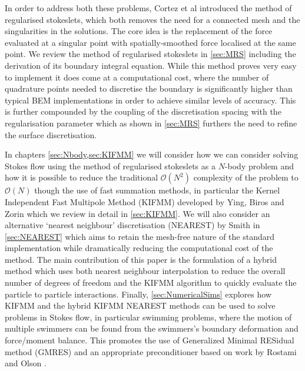 In order to address both these problems, Cortez et al \cite{Cortez2001,Cortez2005} introduced the method of regularised stokeslets, which both removes the need for a connected mesh and the singularities in the solutions. The core idea is the replacement of the force evaluated at a singular point with spatially-smoothed force localised at the same point. We review the method of regularised stokeslets in \cref{sec:MRS} including the derivation of its boundary integral equation. While this method proves very easy to implement it does come at a computational cost, where the number of quadrature points needed to discretise the boundary is significantly higher than typical BEM implementations in order to achieve similar levels of accuracy. This is further compounded by the coupling of the discretisation spacing with the regularisation parameter which as shown in \cref{sec:MRS} furthers the need to refine the surface discretisation. 

In chapters \cref{sec:Nbody,sec:KIFMM} we will consider how we can consider solving Stokes flow using the method of regularised stokeslets as a $N$-body problem and how it is possible to reduce the traditional $\mathcal{O}(N^2)$ complexity of the problem to $\mathcal{O}(N)$ though the use of fast summation methods, in particular the Kernel Independent Fast Multipole Method (KIFMM) developed by Ying, Biros and Zorin \cite{Ying2004} which we review in detail in \cref{sec:KIFMM}. We will also consider an alternative `nearest neighbour' discretisation (NEAREST) by Smith\cite{Smith2018AEquation} in \cref{sec:NEAREST} which aims to retain the mesh-free nature  of the standard implementation while dramatically reducing the computational cost of the method. The main contribution of this paper is the formulation of a hybrid method which uses both nearest neighbour interpolation to reduce the overall number of degrees of freedom and the KIFMM algorithm to quickly evaluate the particle to particle interactions. Finally, \cref{sec:NumericalSims} explores how KIFMM and the hybrid KIFMM NEAREST methods can be used to solve problems in Stokes flow, in particular swimming problems, where the motion of multiple swimmers can be found from the swimmers's boundary deformation and force/moment balance. This promotes the use of Generalized Minimal RESidual method (GMRES) and an appropriate preconditioner based on work by Rostami and Olson \cite{Rostami2019FastBiofluids}.